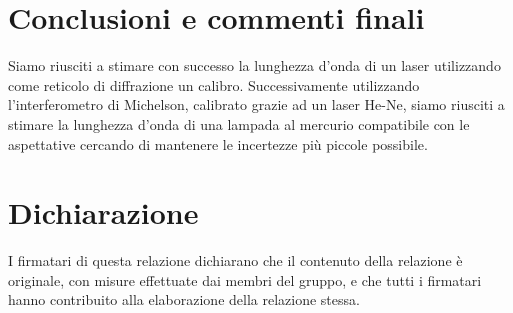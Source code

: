 \documentclass[10pt, a4paper, italian]{article}
\begin{document}
\section*{Conclusioni e commenti finali}
Siamo riusciti a stimare con successo la lunghezza d'onda di un laser utilizzando come reticolo di diffrazione un calibro. Successivamente utilizzando l'interferometro di Michelson, calibrato grazie ad un laser He-Ne, siamo riusciti a stimare la lunghezza d'onda di una lampada al mercurio compatibile con le aspettative cercando di mantenere le incertezze più piccole possibile.

\section*{Dichiarazione}
I firmatari di questa relazione dichiarano che il contenuto della relazione \`e
originale, con misure effettuate dai membri del gruppo, e che tutti i firmatari
hanno contribuito alla elaborazione della relazione stessa.
\end{document}
